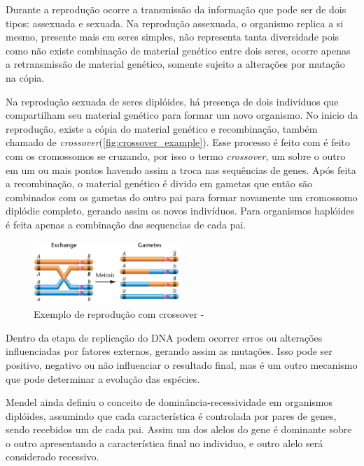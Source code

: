 Durante a reprodução ocorre a transmissão da informação que pode ser de dois tipos: assexuada e sexuada. Na reprodução assexuada, o organismo replica a si mesmo, presente mais em seres simples, não representa tanta diversidade pois como não existe combinação de material genético entre dois seres, ocorre apenas a retransmissão de material genético, somente sujeito a alterações por mutação na cópia.

Na reprodução sexuada de seres diplóides, há presença de dois indivíduos que compartilham seu material genético para formar um novo organismo. No inicio da reprodução, existe a cópia do material genético e recombinação, também chamado de \textit{crossover}(\autoref{fig:crossover_example}). Esse processo é feito com é feito com os cromossomos se cruzando, por isso o termo \textit{crossover},  um sobre o outro em um ou mais pontos havendo assim a troca nas sequências de genes. Após feita a recombinação, o material genético é divido em gametas que então são combinados com os gametas do outro pai para formar novamente um cromossomo diplódie completo, gerando assim os novos indivíduos. Para organismos haplóides é feita apenas a combinação das sequencias de cada pai.

\begin{figure}
	\begin{center}
	\includegraphics[width=0.5\textwidth]{imagens/cross_over.png}
	\caption{Exemplo de reprodução com crossover - \cite{Klug2011}}
	\label{fig:crossover_example}
	\end{center}
\end{figure}


Dentro da etapa de replicação do DNA podem ocorrer erros ou alterações influenciadas por fatores externos, gerando assim as mutações. Isso pode ser positivo, negativo ou não influenciar o resultado final, mas é um outro mecanismo que pode determinar a evolução das espécies.   

Mendel ainda definiu o conceito de dominância-recessividade em organismos diplóides, assumindo que cada característica é controlada por pares de genes, sendo recebidos um de cada pai. Assim um dos alelos do gene é dominante sobre o outro apresentando a característica final no individuo, e outro alelo será considerado recessivo.

